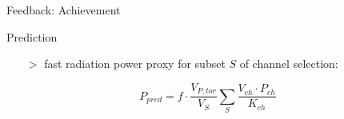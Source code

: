 \documentclass{beamer}
\begin{document}
\begin{frame}{Feedback: Achievement}

    \begin{minipage}{0.48\textwidth}%
        \begin{block}{Prediction}%
            \begin{itemize}%
                \item[$>$]{%
                    fast radiation power proxy for subset $S$ %
                    of channel selection:}%
            \end{itemize}%

            \vspace*{-0.3cm}
            $$P_{pred}=f\cdot%
                \frac{V_{P,tor}}{V_{S}}\sum_{S}%
                \frac{V_{ch}\cdot P_{ch}}{K_{ch}}$$%
        \end{block}%
    
    \end{minipage}\hfill%
    \begin{minipage}{0.48\textwidth}%
                
        

\end{minipage}
\end{frame}
\end{document}
